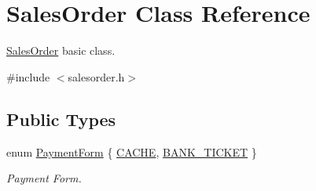 \hypertarget{class_sales_order}{\section{\-Sales\-Order \-Class \-Reference}
\label{class_sales_order}
}


\hyperlink{class_sales_order}{\-Sales\-Order} basic class.  




{\ttfamily \#include $<$salesorder.\-h$>$}

\subsection*{\-Public \-Types}
\begin{DoxyCompactItemize}
\item 
enum \hyperlink{class_sales_order_aea62d62de9cfe64f734061c664156744}{\-Payment\-Form} \{ \hyperlink{class_sales_order_aea62d62de9cfe64f734061c664156744abfe58e9329c6f3ff37cb0df5db2a2c54}{\-C\-A\-C\-H\-E}, 
\hyperlink{class_sales_order_aea62d62de9cfe64f734061c664156744afd1b7c2de470d776b95150014c6c84c0}{\-B\-A\-N\-K\-\_\-\-T\-I\-C\-K\-E\-T}
 \}
\begin{DoxyCompactList}\small\item\em \-Payment \-Form. \end{DoxyCompactList}\end{DoxyCompactItemize}
